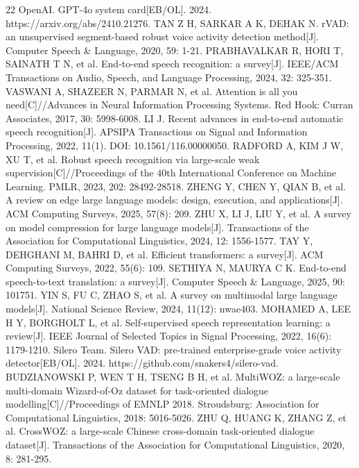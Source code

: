 \documentclass[a4paper,11pt]{article}
\begin{document}
\begin{thebibliography}{22}
 OpenAI. GPT-4o system card[EB/OL]. 2024. https://arxiv.org/abs/2410.21276.
 TAN Z H, SARKAR A K, DEHAK N. rVAD: an unsupervised segment-based robust voice activity detection method[J]. Computer Speech \& Language, 2020, 59: 1-21.
 PRABHAVALKAR R, HORI T, SAINATH T N, et al. End-to-end speech recognition: a survey[J]. IEEE/ACM Transactions on Audio, Speech, and Language Processing, 2024, 32: 325-351.
 VASWANI A, SHAZEER N, PARMAR N, et al. Attention is all you need[C]//Advances in Neural Information Processing Systems. Red Hook: Curran Associates, 2017, 30: 5998-6008.
 LI J. Recent advances in end-to-end automatic speech recognition[J]. APSIPA Transactions on Signal and Information Processing, 2022, 11(1). DOI: 10.1561/116.00000050.
 RADFORD A, KIM J W, XU T, et al. Robust speech recognition via large-scale weak supervision[C]//Proceedings of the 40th International Conference on Machine Learning. PMLR, 2023, 202: 28492-28518.
 ZHENG Y, CHEN Y, QIAN B, et al. A review on edge large language models: design, execution, and applications[J]. ACM Computing Surveys, 2025, 57(8): 209.
 ZHU X, LI J, LIU Y, et al. A survey on model compression for large language models[J]. Transactions of the Association for Computational Linguistics, 2024, 12: 1556-1577.
 TAY Y, DEHGHANI M, BAHRI D, et al. Efficient transformers: a survey[J]. ACM Computing Surveys, 2022, 55(6): 109.
 SETHIYA N, MAURYA C K. End-to-end speech-to-text translation: a survey[J]. Computer Speech \& Language, 2025, 90: 101751.
 YIN S, FU C, ZHAO S, et al. A survey on multimodal large language models[J]. National Science Review, 2024, 11(12): nwae403.
 MOHAMED A, LEE H Y, BORGHOLT L, et al. Self-supervised speech representation learning: a review[J]. IEEE Journal of Selected Topics in Signal Processing, 2022, 16(6): 1179-1210.
 Silero Team. Silero VAD: pre-trained enterprise-grade voice activity detector[EB/OL]. 2024. https://github.com/snakers4/silero-vad.
 BUDZIANOWSKI P, WEN T H, TSENG B H, et al. MultiWOZ: a large-scale multi-domain Wizard-of-Oz dataset for task-oriented dialogue modelling[C]//Proceedings of EMNLP 2018. Stroudsburg: Association for Computational Linguistics, 2018: 5016-5026.
 ZHU Q, HUANG K, ZHANG Z, et al. CrossWOZ: a large-scale Chinese cross-domain task-oriented dialogue dataset[J]. Transactions of the Association for Computational Linguistics, 2020, 8: 281-295.

\end{thebibliography}
\end{document}
